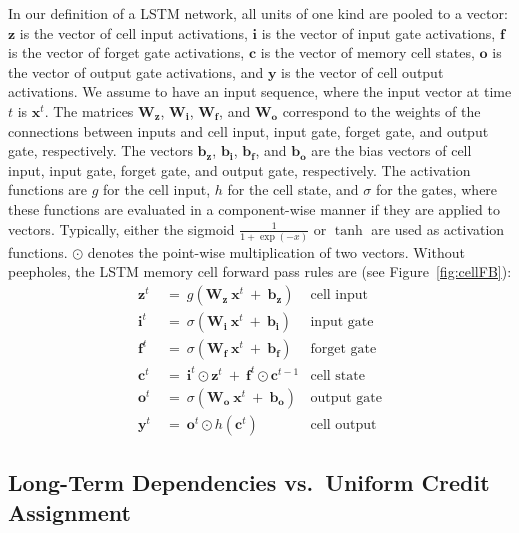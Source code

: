 \documentclass{article}
\newcommand\Bb{\bm{b}}
\newcommand\Bc{\bm{c}}
\newcommand\Bf{\bm{f}}
\newcommand\Bi{\bm{i}}
\newcommand\Bo{\bm{o}}
\newcommand\Bx{\bm{x}}
\newcommand\By{\bm{y}}
\newcommand\Bz{\bm{z}}
\newcommand\BW{\bm{W}}
\begin{document}
\begin{appendices}
In our definition of a LSTM network, all units of one kind are
pooled to a vector: $\Bz$ is the vector of cell input
activations, $\Bi$ is the vector of input gate
activations,  $\Bf$ is the vector of forget gate
activations,  $\Bc$ is the vector of memory cell states,
$\Bo$ is the vector of output gate
activations, and $\By$ is the vector of cell output 
activations.
We assume to have an input sequence, where the input vector at 
time $t$ is $\Bx^t$. The matrices $\BW_{\Bz}$, $\BW_{\Bi}$,
$\BW_{\Bf}$, and $\BW_{\Bo}$ correspond to the
weights of the connections between inputs and cell input, input gate, forget gate, and
output gate, respectively.
The vectors  $\Bb_{\Bz}$, $\Bb_{\Bi}$,
$\Bb_{\Bf}$, and $\Bb_{\Bo}$ are the bias vectors of cell input, input gate, forget gate, and
output gate, respectively.
The activation functions are $g$ for the cell input, $h$ for the cell
state, and $\sigma$ for the gates, where these functions are evaluated in a
component-wise manner if they are applied to vectors.
Typically, either the sigmoid $\frac{1}{1+\exp(-x)}$ or
$\tanh$ are used as activation functions.
$\odot$ denotes the point-wise multiplication
of two vectors. Without peepholes, the LSTM memory cell forward pass rules
are (see Figure~\ref{fig:cellFB}):
\begin{align}
\Bz^t \ &= \ g \left( \BW_{\Bz} \ \Bx^t \ + \
   \Bb_{\Bz}\right) & \text{cell input} \\
\Bi^t \ &= \ \sigma \left( \BW_{\Bi} \ \Bx^t \ + \
    \Bb_{\Bi} \right) & \text{input gate} \\
\Bf^t \ &= \ \sigma \left( \BW_{\Bf} \ \Bx^t \ + \
   \Bb_{\Bf} \right) & \text{forget gate} \\
\Bc^t \ &= \  \Bi^t \odot \Bz^t \ + \ 
\Bf^t \odot \Bc^{t-1} & \text{cell state} \\
\Bo^t \ &= \ \sigma \left( \BW_{\Bo} \ \Bx^t \ + \
  \Bb_{\Bo} \right) & \text{output gate} \\
\By^t \ &= \ \Bo^t \odot h\left( \Bc^t \right) &
\text{cell output}
\end{align}

\subsection{Long-Term Dependencies vs.\ Uniform Credit Assignment}


\end{appendices}
\end{document}
